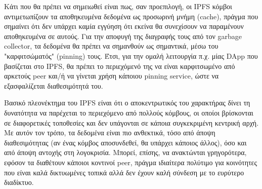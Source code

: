 Κάτι που θα πρέπει να σημειωθεί είναι πως, σαν προεπιλογή, οι IPFS κόμβοι αντιμετωπίζουν τα αποθηκευμένα δεδομένα ως προσωρινή μνήμη (cache), πράγμα που σημαίνει ότι δεν υπάρχει καμία εγγύηση ότι εκείνα θα συνεχίσουν να παραμένουν αποθηκευμένα σε αυτούς. Για την αποφυγή της διαγραφής τους από τον garbage collector, τα δεδομένα θα πρέπει να σημανθούν ως σημαντικά, μέσω του "καρφιτσώματός" (pinning) τους. Έτσι, για την ομαλή λειτουργία π.χ. μίας DApp που βασίζεται στο IPFS, θα πρέπει το περιεχόμενό της να είναι καρφιτσωμένο από αρκετούς peer και/ή να γίνεται χρήση κάποιου pinning service, ώστε να εξασφαλίζεται διαθεσιμότητά του.

Βασικό πλεονέκτημα του IPFS είναι ότι ο αποκεντρωτικός του χαρακτήρας δίνει τη δυνατότητα να παρέχεται το περιεχόμενο από πολλούς κόμβους, οι οποίοι βρίσκονται σε διαφορετικές τοποθεσίες και δεν υπάγονται σε κάποια συγκεκριμένη κεντρική αρχή. Με αυτόν τον τρόπο, τα δεδομένα είναι πιο ανθεκτικά, τόσο από άποψη διαθεσιμότητας (αν ένας κόμβος αποσυνδεθεί, θα υπάρχει κάποιος άλλος), όσο και από άποψη αντοχής στη λογοκρισία. Μπορεί, επίσης, να ανακτώνται γρηγορότερα, εφόσον τα διαθέτουν κάποιοι κοντινοί peer, πράγμα ιδιαίτερα πολύτιμο για κοινότητες που είναι καλά δικτυωμένες τοπικά αλλά δεν έχουν καλή σύνδεση με το ευρύτερο διαδίκτυο.